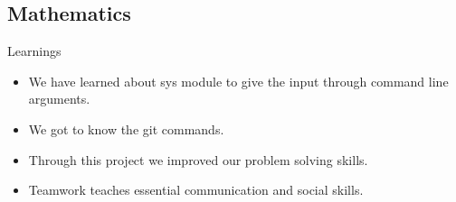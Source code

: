 \documentclass{beamer}
\begin{document}
\subsection{Mathematics}
\begin{frame}{\Huge Learnings}
\begin{itemize}
   

\Large
\item We have learned about sys module to give the input through command line arguments.
\item We got to know the git commands.
\item Through this project we improved our problem solving skills.
\item Teamwork teaches essential communication and social skills.

\end{itemize}


\end{frame}
    
\end{document}
